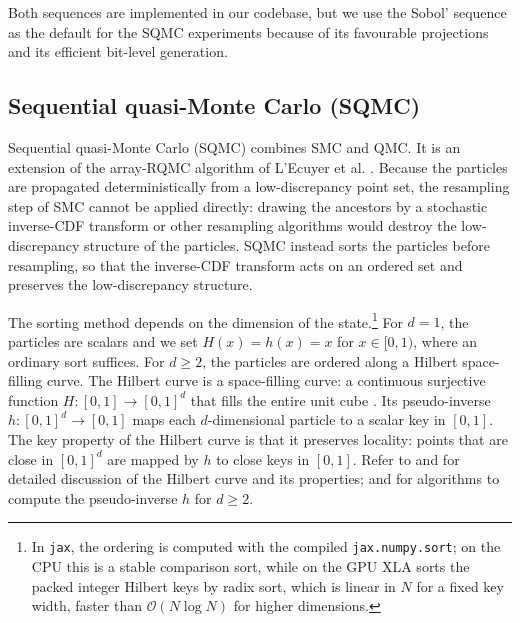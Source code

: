 Both sequences are implemented in our codebase, but we use the Sobol' sequence as the default for the SQMC experiments because of its favourable projections and its efficient bit-level generation.

\subsection{Sequential quasi-Monte Carlo (SQMC)}
\label{sec:sqmc}

Sequential quasi-Monte Carlo (SQMC) combines SMC and QMC. It is an extension of the array-RQMC algorithm of L'Ecuyer et al. \citep{lecuyerlectuffin2006arrayrqmc}. Because the particles are propagated deterministically from a low-discrepancy point set, the resampling step of SMC cannot be applied directly: drawing the ancestors by a stochastic inverse-CDF transform or other resampling algorithms would destroy the low-discrepancy structure of the particles. SQMC instead sorts the particles before resampling, so that the inverse-CDF transform acts on an ordered set and preserves the low-discrepancy structure.

The sorting method depends on the dimension of the state.\footnote{In \texttt{jax}, the ordering is computed with the compiled \texttt{jax.numpy.sort}; on the CPU this is a stable comparison sort, while on the GPU XLA sorts the packed integer Hilbert keys by radix sort, which is linear in $N$ for a fixed key width, faster than $\mathcal{O}(N\log N)$ for higher dimensions.} For $d=1$, the particles are scalars and we set $H(x) = h(x) = x$ for $x \in [0,1)$, where an ordinary sort suffices. For $d \geq 2$, the particles are ordered along a Hilbert space-filling curve. The Hilbert curve is a space-filling curve: a continuous surjective function $H: [0,1] \to [0,1]^d$ that fills the entire unit cube \citep{sagan1994spacefilling}. Its pseudo-inverse $h: [0,1]^d \to [0,1]$ maps each $d$-dimensional particle to a scalar key in $[0,1]$. The key property of the Hilbert curve is that it preserves locality: points that are close in $[0,1]^d$ are mapped by $h$ to close keys in $[0,1]$. Refer to \citet{sagan1994spacefilling} and \citet{butz1969convergencehilbert} for detailed discussion of the Hilbert curve and its properties; \citet{hamiltonrauchaplin2008compacthilbert} and \citet{chopingerber2015sqmc} for algorithms to compute the pseudo-inverse $h$ for $d \geq 2$.

